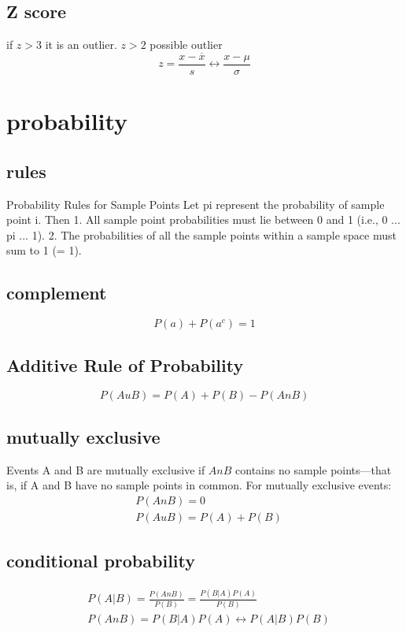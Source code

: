 \documentclass[fontsize=6pt, paper=a4]{scrartcl}
\begin{document}
\begin{multicols*}{4}
\subsection{Z score}
if $z>3$ it is an outlier. $z>2$ possible outlier
\begin{equation}
	z=\frac{x-\overline{x}}{s} \leftrightarrow \frac{x-\mu}{\sigma}
\end{equation}

\section{probability}
\subsection{rules}
Probability Rules for Sample Points 
Let pi represent the probability of sample point i. Then 
1. All sample point probabilities must lie between 0 and 1 (i.e., 0 ... pi ... 1). 
2. The probabilities of all the sample points within a sample space must sum to 1 (= 1). 
\subsection{complement}
\begin{equation}
	P(a)+P(a^c)=1
\end{equation}

\subsection{Additive Rule of Probability}
\begin{equation}
	P(AuB) = P(A) + P(B) - P(A nB)
\end{equation}
\subsection{mutually exclusive}
Events A and B are mutually exclusive if $AnB$ contains no sample points—that is, if A and B have no sample points in common. For mutually exclusive events:
\begin{align}
	&P(AnB)=0\\
	&P(AuB)=P(A)+P(B)
\end{align}

\subsection{conditional probability}
\begin{align}
	&P(A|B)=\frac{P(AnB)}{P(B)}=\frac{P(B|A)P(A)}{P(B)}\\
	&P(AnB)=P(B|A)P(A) \leftrightarrow P(A|B)P(B)
\end{align}

\end{multicols*}
\end{document}
